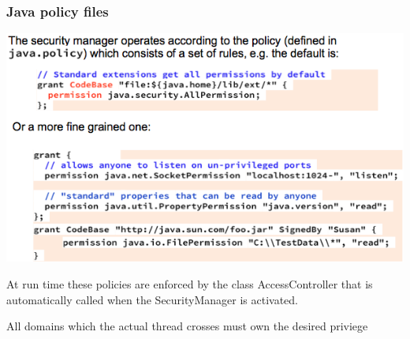 \documentclass[10pt]{article}
\begin{document}
\subsubsection{Java policy files}
\begin{center}
	\includegraphics[scale=0.3]{policy-files.png}
\end{center}
At run time these policies are enforced by the class AccessController that is automatically called when the SecurityManager is activated.

All domains which the actual thread crosses must own the desired priviege
\end{document}
